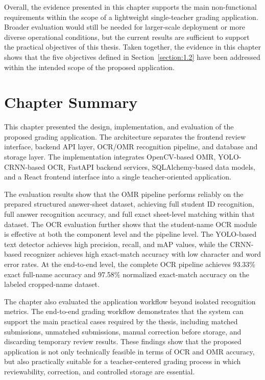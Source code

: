 \documentclass[../Main.tex]{subfiles}
\begin{document}
Overall, the evidence presented in this chapter supports the main
non-functional requirements within the scope of a lightweight single-teacher
grading application. Broader evaluation would still be needed for larger-scale
deployment or more diverse operational conditions, but the current results are
sufficient to support the practical objectives of this thesis. Taken together,
the evidence in this chapter shows that the five objectives defined in
Section~\ref{section:1.2} have been addressed within the intended scope of the
proposed application.

\section{Chapter Summary}
\label{section:4.4}

This chapter presented the design, implementation, and evaluation of the
proposed grading application. The architecture separates the frontend review
interface, backend API layer, OCR/OMR recognition pipeline, and database and
storage layer. The implementation integrates OpenCV-based OMR, YOLO-CRNN-based
OCR, FastAPI backend services, SQLAlchemy-based data models, and a React
frontend interface into a single teacher-oriented application.

The evaluation results show that the OMR pipeline performs reliably on the
prepared structured answer-sheet dataset, achieving full student ID recognition,
full answer recognition accuracy, and full exact sheet-level matching within
that dataset. The OCR evaluation further shows that the student-name OCR module
is effective at both the component level and the pipeline level. The YOLO-based
text detector achieves high precision, recall, and mAP values, while the
CRNN-based recognizer achieves high exact-match accuracy with low character and
word error rates. At the end-to-end level, the complete OCR pipeline achieves
93.33\% exact full-name accuracy and 97.58\% normalized exact-match accuracy on
the labeled cropped-name dataset.

The chapter also evaluated the application workflow beyond isolated recognition
metrics. The end-to-end grading workflow demonstrates that the system can
support the main practical cases required by the thesis, including matched
submissions, unmatched submissions, manual correction before
storage, and discarding temporary review results. These findings show that the
proposed application is not only technically feasible in terms of OCR and OMR
accuracy, but also practically suitable for a teacher-centered grading process
in which reviewability, correction, and controlled storage are essential.
\end{document}
